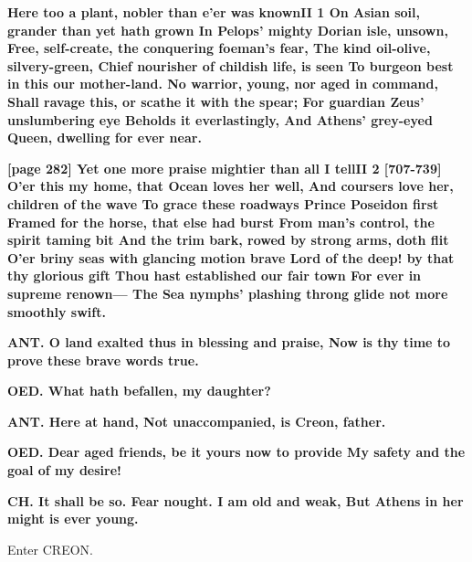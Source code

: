 \documentclass[11pt,letter]{book}
\begin{document}
\par \textbf{Here too a plant, nobler than e’er was knownII 1 On Asian soil, grander than yet hath grown In Pelops’ mighty Dorian isle, unsown, Free, self-create, the conquering foeman’s fear, The kind oil-olive, silvery-green, Chief nourisher of childish life, is seen To burgeon best in this our mother-land. No warrior, young, nor aged in command, Shall ravage this, or scathe it with the spear; For guardian Zeus’ unslumbering eye Beholds it everlastingly, And Athens’ grey-eyed Queen, dwelling for ever near.}
\par 

\par \textbf{[page 282] Yet one more praise mightier than all I tellII 2 [707-739] O’er this my home, that Ocean loves her well, And coursers love her, children of the wave To grace these roadways Prince Poseidon first Framed for the horse, that else had burst From man’s control, the spirit taming bit And the trim bark, rowed by strong arms, doth flit O’er briny seas with glancing motion brave Lord of the deep! by that thy glorious gift Thou hast established our fair town For ever in supreme renown— The Sea nymphs’ plashing throng glide not more smoothly swift.}
\par 

\par \textbf{ANT. O land exalted thus in blessing and praise, Now is thy time to prove these brave words true.}
\par 

\par \textbf{OED. What hath befallen, my daughter?}
\par 

\par \textbf{ANT. Here at hand, Not unaccompanied, is Creon, father.}
\par 

\par \textbf{OED. Dear aged friends, be it yours now to provide My safety and the goal of my desire!}
\par 

\par \textbf{CH. It shall be so. Fear nought. I am old and weak, But Athens in her might is ever young.}
\par 

\par  Enter CREON.
\end{document}

